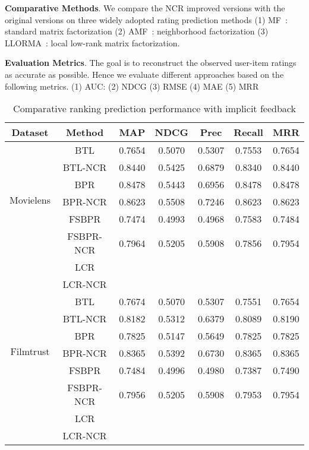 \documentclass[letterpaper]{article} %
\begin{document}
\textbf{Comparative Methods}. We compare the NCR improved versions with the original versions on three widely adopted rating prediction methods (1) MF~\cite{Koren2009Matrix}: standard matrix factorization  (2) AMF~\cite{Koren2008Factorization}: neighborhood factorization (3) LLORMA~\cite{Lee2013Local}: local low-rank matrix factorization. 

\textbf{Evaluation Metrics}.  The goal is to reconstruct the observed user-item ratings as accurate as possible. Hence we evaluate different approaches based on the following metrics. (1) AUC: (2) NDCG (3) RMSE (4) MAE (5) MRR

\begin{table}[htp]
\tiny
\caption{Comparative ranking prediction performance with implicit feedback}
\begin{center}
\begin{tabular}{|c|c|c|c|c|c|c|}
\hline
Dataset & Method & MAP & NDCG & Prec & Recall & MRR \\\hline
\multirow{6}{*}{Movielens} & BTL &0.7654 &0.5070 &0.5307 &0.7553 &0.7654 \\\cline{2-7}
 & BTL-NCR &0.8440 &0.5425 &0.6879 &0.8340 &0.8440 \\\cline{2-7}
 & BPR &0.8478 &0.5443 &0.6956 &0.8478 &0.8478 \\\cline{2-7}
 & BPR-NCR &0.8623 &0.5508 &0.7246 &0.8623 &0.8623 \\\cline{2-7}
 & FSBPR &0.7474 &0.4993 &0.4968 &0.7583 &0.7484 \\\cline{2-7}
  & FSBPR-NCR &0.7964 &0.5205 &0.5908 &0.7856 &0.7954 \\\cline{2-7}
   & LCR & & & & & \\\cline{2-7}
 & LCR-NCR & & & & & \\\hline
\multirow{6}{*}{Filmtrust} & BTL &0.7674 &0.5070 &0.5307 &0.7551 &0.7654 \\\cline{2-7}
 & BTL-NCR &0.8182 &0.5312 &0.6379 &0.8089 &0.8190 \\\cline{2-7}
 & BPR &0.7825 &0.5147 &0.5649 &0.7825 &0.7825  \\\cline{2-7}
 & BPR-NCR &0.8365 &0.5392 &0.6730 &0.8365 &0.8365 \\\cline{2-7}
 & FSBPR &0.7484 &0.4996 &0.4980 &0.7387 &0.7490 \\\cline{2-7}
  & FSBPR-NCR &0.7956 &0.5205 &0.5908 &0.7953 &0.7954 \\\cline{2-7}
   & LCR & & & & & \\\cline{2-7}
 & LCR-NCR & & & & & \\\hline

\end{tabular}
\end{center}
\end{table}
\end{document}
